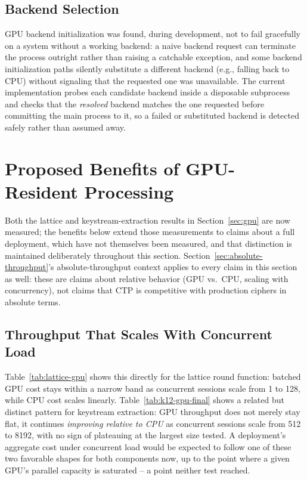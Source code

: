 \documentclass[twocolumn,10pt,journal,compsoc]{IEEEtran}
\begin{document}
\subsection{Backend Selection}
GPU backend initialization was found, during development, not to fail gracefully on a system without a working backend: a naive backend request can terminate the process outright rather than raising a catchable exception, and some backend initialization paths silently substitute a different backend (e.g., falling back to CPU) without signaling that the requested one was unavailable. The current implementation probes each candidate backend inside a disposable subprocess and checks that the \emph{resolved} backend matches the one requested before committing the main process to it, so a failed or substituted backend is detected safely rather than assumed away.

\section{Proposed Benefits of GPU-Resident Processing}
\label{sec:benefits}
Both the lattice and keystream-extraction results in Section~\ref{sec:gpu} are now measured; the benefits below extend those measurements to claims about a full deployment, which have not themselves been measured, and that distinction is maintained deliberately throughout this section. Section~\ref{sec:absolute-throughput}'s absolute-throughput context applies to every claim in this section as well: these are claims about relative behavior (GPU vs.\ CPU, scaling with concurrency), not claims that CTP is competitive with production ciphers in absolute terms.

\subsection{Throughput That Scales With Concurrent Load}
Table~\ref{tab:lattice-gpu} shows this directly for the lattice round function: batched GPU cost stays within a narrow band as concurrent sessions scale from 1 to 128, while CPU cost scales linearly. Table~\ref{tab:k12-gpu-final} shows a related but distinct pattern for keystream extraction: GPU throughput does not merely stay flat, it continues \emph{improving relative to CPU} as concurrent sessions scale from 512 to 8192, with no sign of plateauing at the largest size tested. A deployment's aggregate cost under concurrent load would be expected to follow one of these two favorable shapes for both components now, up to the point where a given GPU's parallel capacity is saturated -- a point neither test reached.
\end{document}
